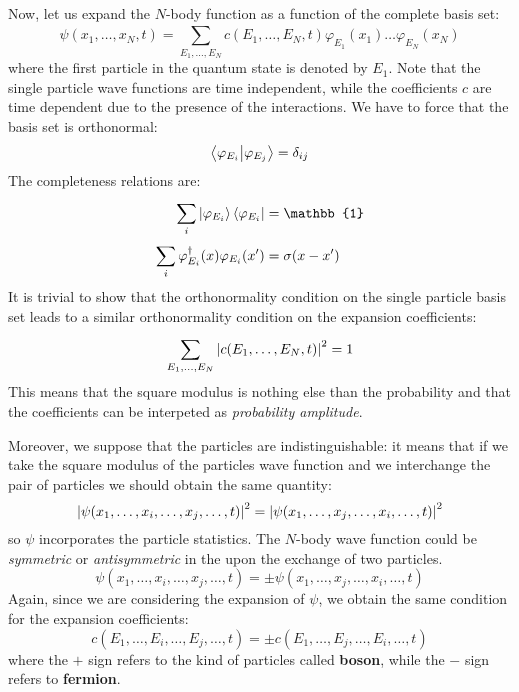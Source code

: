 \documentclass[../main/main.tex]{subfiles}
\begin{document}
Now, let us expand the \( N \)-body function as a function of the complete basis set:
\begin{equation}
  \psi (x_1, \dots, x_N, t) = \sum_{E_1, \dots, E_N}^{} c(E_1,\dots,E_N,t) \varphi _{E_1} (x_1) \dots \varphi _{E_N} (x_N)
\end{equation}
where the first particle in the quantum state is denoted by \( E_1 \). Note that the single particle wave functions are time independent, while the coefficients \( c \) are time dependent due to the presence of the interactions. We have to force that the basis set is orthonormal:
 \begin{equation}
   \bra{\varphi _{E_i}}\ket{\varphi _{E_j}} = \delta _{ij}
 \end{equation}
 The completeness relations are:
\begin{subequations}
\begin{align}
  \sum_{i}^{} \ket{\varphi _{E_i}}\bra{\varphi _{E_i}} &= \mathbb{1}\\ \sum_{i}^{} \varphi _{E_i}^{\dagger}(x) \varphi _{E_i}(x')  &= \sigma (x-x')
\end{align}
\end{subequations}
It is trivial to show that the orthonormality condition on the single particle basis set leads to a similar orthonormality condition on the expansion coefficients:
\begin{equation}
  \sum_{E_1, \dots, E_N}^{} \abs{c(E_1,\dots,E_N,t)}^2 = 1
\end{equation}
This means that the square modulus is nothing else than the probability and that the coefficients can be interpeted as \emph{probability amplitude}.

Moreover, we suppose that the particles are indistinguishable: it means that if we take the square modulus of the particles wave function and we interchange the pair of particles we should obtain the same quantity:
\begin{equation*}
  \abs{\psi (x_1,\dots,x_i, \dots,x_j,\dots,t)}^2 = \abs{\psi (x_1,\dots,x_j, \dots,x_i,\dots,t)}^2
\end{equation*}
so \( \psi  \) incorporates the particle statistics. The \( N \)-body wave function could be \emph{symmetric} or \emph{antisymmetric} in the upon the exchange of two particles.
\begin{equation}
\psi (x_1,\dots,x_i, \dots,x_j,\dots,t) = \pm \psi (x_1,\dots,x_j, \dots,x_i,\dots,t)
\end{equation}
Again, since we are considering the expansion of \( \psi  \), we obtain the same condition for the expansion coefficients:
\begin{equation}
  c (E_1,\dots,E_i,\dots,E_j,\dots,t) = \pm c (E_1,\dots,E_j,\dots,E_i,\dots,t)
\end{equation}
where the \( + \) sign refers to the kind of particles called \textbf{boson}, while the \( - \) sign refers to \textbf{fermion}.
\end{document}
